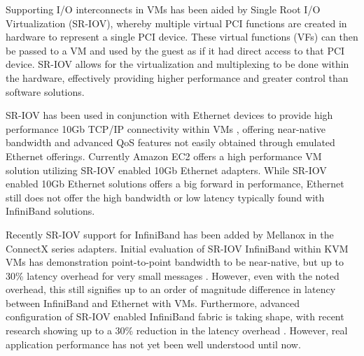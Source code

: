 \documentclass[10pt]{sigplanconf}
\begin{document}
Supporting I/O interconnects in VMs has been aided by Single Root I/O Virtualization (SR-IOV), whereby multiple virtual PCI functions are created in hardware to represent a single PCI device. These virtual functions (VFs) can then be passed to a VM and used by the guest as if it had direct access to that PCI device. SR-IOV allows for the virtualization and multiplexing to be done within the hardware, effectively providing higher performance and greater control than software solutions. 

SR-IOV has been used in conjunction with Ethernet devices to provide high performance 10Gb TCP/IP connectivity within VMs \cite{Liu2010}, offering near-native bandwidth and advanced QoS features not easily obtained through emulated Ethernet offerings. Currently Amazon EC2 offers a high performance VM solution utilizing SR-IOV enabled 10Gb Ethernet adapters. While SR-IOV enabled 10Gb Ethernet solutions offers a big forward in performance, Ethernet still does not offer the high bandwidth or low latency typically found with InfiniBand solutions. 

Recently SR-IOV support for InfiniBand has been added by Mellanox in the ConnectX series adapters. Initial evaluation of SR-IOV InfiniBand within KVM VMs has demonstration point-to-point bandwidth to be near-native, but up to 30\% latency overhead for very small messages \cite{jose2013sr, RuivoAGTKNR14}. However, even with the noted overhead, this still signifies up to an order of magnitude difference in latency between InfiniBand and Ethernet with VMs. Furthermore, advanced configuration of SR-IOV enabled InfiniBand fabric is taking shape, with recent research showing up to a 30\% reduction in the latency overhead \cite{Musleh2014cloud}. However, real application performance has not yet been well understood until now. 
\end{document}
